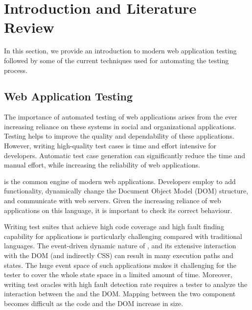 \chapter{Introduction and Literature Review} \label{chap:intro}
In this section, we provide an introduction to modern web application testing followed by some of the current techniques used for automating the testing process.
 
\section{Web Application Testing} \label{Sec:web-testing}
The importance of automated testing of web applications arises from the ever increasing
reliance on these systems in social and organizational
applications. Testing helps to improve the quality and dependability of these applications. However, writing high-quality test cases is time and effort intensive for developers.
Automatic test case generation can significantly reduce the time and manual effort, while
increasing the reliability of web applications.

\javascript is the common engine of modern web applications. 
Developers employ \javascript to add functionality, dynamically change the Document Object Model (DOM) structure,
and communicate with web servers. Given the increasing reliance of web applications on this language, it is important to check its correct behaviour.

Writing test suites that achieve high code coverage and high fault finding capability for \javascript applications is particularly challenging compared with traditional languages.
The event-driven dynamic nature of \javascript, and its extensive interaction with the DOM (and indirectly CSS) can result in many execution paths and states. The huge event space of such applications makes it challenging for the tester to cover the whole state space in a limited amount of time. Moreover, writing test oracles with high fault detection rate requires a tester to analyze the interaction between the \javascript and the DOM. Mapping between the two component becomes difficult as the \javascript code and the DOM increase in size. 

